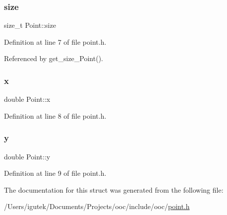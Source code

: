 \mbox{\label{structPoint_af3ba5fb6c2b53483ccf31342a19ad6ae}} 
\subsubsection{\texorpdfstring{size}{size}}
{\footnotesize\ttfamily size\+\_\+t Point\+::size}



Definition at line 7 of file point.\+h.



Referenced by get\+\_\+size\+\_\+\+Point().

\mbox{\label{structPoint_ab99c56589bc8ad5fa5071387110a5bc7}} 
\subsubsection{\texorpdfstring{x}{x}}
{\footnotesize\ttfamily double Point\+::x}



Definition at line 8 of file point.\+h.

\mbox{\label{structPoint_afa38be143ae800e6ad69ce8ed4df62d8}} 
\subsubsection{\texorpdfstring{y}{y}}
{\footnotesize\ttfamily double Point\+::y}



Definition at line 9 of file point.\+h.



The documentation for this struct was generated from the following file\+:\begin{DoxyCompactItemize}
\item 
/\+Users/igutek/\+Documents/\+Projects/ooc/include/ooc/\mbox{\hyperlink{point_8h}{point.\+h}}\end{DoxyCompactItemize}
